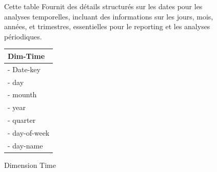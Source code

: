 \begin{figure}[htbp]
    \centering
    \begin{minipage}{0.60\textwidth}


        Cette table Fournit des détails structurés sur les dates pour les analyses temporelles, incluant des informations sur les jours, mois, années, et trimestres, essentielles pour le reporting et les analyses périodiques.


    \end{minipage}
    \hfill
    \begin{minipage}{0.38\textwidth}

        \renewcommand{\arraystretch}{1.7}
        \centering
        \begin{tabular}{|p{4cm}|}
            \hline
            \textbf{Dim-Time} \\
            \hline
            - Date-key        \\

            - day             \\

            - mounth          \\

            - year            \\

            - quarter         \\

            - day-of-week     \\

            - day-name        \\
            \hline
        \end{tabular}

        \caption{Dimension Time}

    \end{minipage}
\end{figure}

